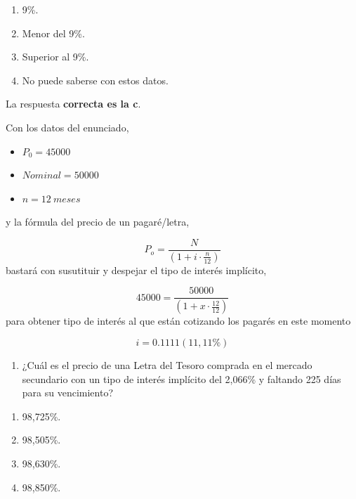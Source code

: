 \documentclass[
  letterpaper,
  DIV=11,
  numbers=noendperiod]{scrreprt}
\providecommand{\tightlist}{%
  \setlength{\itemsep}{0pt}\setlength{\parskip}{0pt}}\usepackage{longtable,booktabs,array}
\begin{document}
\begin{tcolorbox}
\begin{enumerate}
\def\labelenumi{\alph{enumi}.}
\item
  9\%.
\item
  Menor del 9\%.
\item
  Superior al 9\%.
\item
  No puede saberse con estos datos.
\end{enumerate}

\begin{tcolorbox}[enhanced jigsaw, toprule=.15mm, left=2mm, arc=.35mm, breakable, bottomrule=.15mm, opacityback=0, rightrule=.15mm, leftrule=.75mm, colframe=quarto-callout-note-color-frame, colback=white]
\begin{minipage}[t]{5.5mm}
\textcolor{quarto-callout-note-color}{\faInfo}
\end{minipage}%
\begin{minipage}[t]{\textwidth - 5.5mm}

La respuesta \textbf{correcta es la c}.

Con los datos del enunciado,

\begin{itemize}
\item
  \(P_0=45000\)
\item
  \(Nominal= 50000\)
\item
  \(n=12 \ meses\)
\end{itemize}

y la fórmula del precio de un pagaré/letra,

\[P_o=\frac{N}{\left(1+i\cdot \frac{n}{12}\right)}\] bastará con
susutituir y despejar el tipo de interés implícito,

\[45000=\frac{50000}{\left(1+x\cdot \frac{12}{12}\right)}\] para obtener
tipo de interés al que están cotizando los pagarés en este momento

\[i=0.1111(11,11\%)\]

\end{minipage}%
\end{tcolorbox}

\begin{enumerate}
\def\labelenumi{\arabic{enumi}.}
\setcounter{enumi}{4}
\tightlist
\item
  ¿Cuál es el precio de una Letra del Tesoro comprada en el mercado
  secundario con un tipo de interés implícito del 2,066\% y faltando 225
  días para su vencimiento?
\end{enumerate}

\begin{enumerate}
\def\labelenumi{\alph{enumi}.}
\item
  98,725\%.
\item
  98,505\%.
\item
  98,630\%.
\item
  98,850\%.
\end{enumerate}


\end{tcolorbox}
\end{document}
